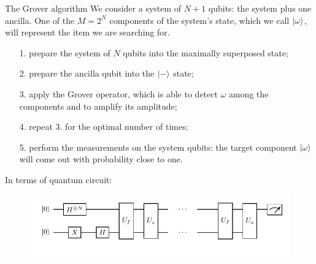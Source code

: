 \documentclass[aspectratio=169, 8pt, xcolor={svgnames}, hyperref={linkcolor=black}]{beamer}
\begin{document}
\begin{frame}{The Grover algorithm}
We consider a system of $N+1$ qubits: the system plus one ancilla. One of the $M=2^N$ components of the system's
state, which we call $\ket{\omega}$, will represent the item we are searching for.

\begin{itemize}[noitemsep]
\item[1.] prepare the system of $N$ qubits into the maximally superposed state;
\item[2.] prepare the ancilla qubit into the $\ket{-}$ state;
\item[3.] apply the Grover operator, which is able to detect $\omega$ among the components
and to amplify its amplitude;
\item[4.] repeat 3. for the optimal number of times;
\item[5.] perform the measurements on the system qubits: the target component $\ket{\omega}$
will come out with probability close to one.
\end{itemize}
\pause

In terms of quantum circuit:
\begin{figure}
    \includegraphics[width=.9\textwidth]{figures/grover-circ.pdf}
\end{figure}


\end{frame}
\end{document}
